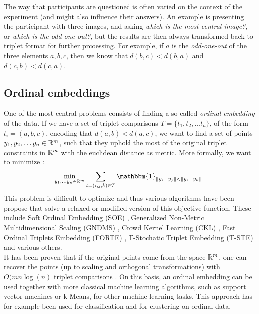 The way that participants are questioned is often varied on the context of the experiment (and might also influence their answers). An
example is presenting the participant with three images, and asking \textit{which is the most central image?}, or \textit{which is the odd one out?},
but the results are then always transformed back to triplet format for further prcoessing. For example, if $a$ is the \textit{odd-one-out} of the three elements $a,b,c$, 
then we know that $d(b,c) < d(b,a)$ and $d(c, b) < d(c,a)$. 

\subsection{Ordinal embeddings}
One of the most central problems consists of finding a so called \textit{ordinal embedding} of the data. If we have a set of triplet comparisons $T = \{t_1, t_2, \ldots t_n\}$, 
of the form $t_i = \left( a,b,c \right)$, encoding that $d(a,b) < d(a,c)$, 
we want to find a set of points $y_1, y_2, \ldots y_n \in \mathbb{R}^{m}$, such that they uphold the most of the original triplet constraints in $\mathbb{R}^{m}$ with the euclidean distance
as metric. More formally, we want to minimize \cite{vankadaraInsightsOrdinalEmbedding2019}:
\[
    \min_{y_1, \ldots y_n \in \R^{m}} \sum_{t=\left( i,j,k \right)  \in T} \mathbbm{1}_{ \|y_i - y_j\| < \|y_i - y_k\| }
.\] 
This problem is difficult to optimize and thus various algorithms have been propose that solve a relaxed or modified version of this objective function. 
These include Soft Ordinal Embedding (SOE) \cite{teradaLocalOrdinalEmbedding2014}, Generalized Non-Metric Multidimensional Scaling (GNDMS) \cite{agarwalGeneralizedNonmetricMultidimensional}, 
Crowd Kernel Learning (CKL) \cite{tamuzAdaptivelyLearningCrowd2011}, Fast Ordinal Triplets Embedding (FORTE) \cite{jainFiniteSamplePrediction2016},
T-Stochatic Triplet Embedding (T-STE) \cite{vandermaatenStochasticTripletEmbedding2012} and various others. \\

It has been proven that if the original points come from the space $\mathbb{R}^{m}$, one can recover the points (up to scaling and orthogonal transformations) with $O(mn\log(n)$ triplet comparisons
\cite{jainFiniteSamplePrediction2016}. On this basis, an ordinal embedding can be used together with more classical machine learning algorithms, such as support vector machines or k-Means,
for other machine learning tasks. This approach has for example been used for classification \cite{AdaptivelyLearningCrowd2011, kleindessnerLensDepthFunction2016} and for clustering \cite{kleindessnerLensDepthFunction2016} on ordinal data. \\

